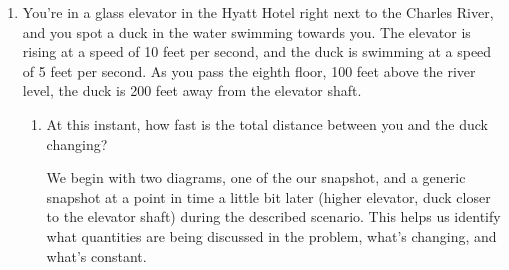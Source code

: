 \documentclass{article}
\begin{document}
\begin{enumerate}
\begin{enumerate}
    \begin{solution}
      
      This translates into asking when $\frac{d\theta}{dt}$ is the greatest. From our previous work, we can solve for $\frac{d\theta}{dt}$ after differentiating:
      \begin{align*}
           \sec^2\theta \frac{d\theta}{dt} &= \frac{1}{80}\cdot \frac{dx}{dt}\\
           \frac{d\theta}{dt}&=\cos^2 \theta \cdot \frac{1}{80}\cdot \frac{dx}{dt}
      \end{align*}
      The bear is still moving at 25 feet per second, so we can input $\frac{dx}{dt}=-25$, giving us:
      $$\frac{d\theta}{dt}= \frac{-25}{80}\cdot \cos^2 \theta $$
      The magnitude of a quantity is separate from its sign. \\
      
      We can see from this equation that $\frac{d\theta}{dt}$ will be at its largest when $\cos^2\theta$ is at its largest, which occurs when $\cos^2\theta = 1$, or when $\theta = 0$. Where is the bear when $\theta = 0$? Directly in front of the woman, which makes the bear 
  \end{solution}

  \end{enumerate}

  \pspace{\newpage}

\item \label{gottlieb-21.3.23}
\begin{problem}
  You're in a glass elevator in the Hyatt Hotel right next to the
  Charles River, and you spot a duck in the water swimming towards you. The elevator is rising at a speed of 10 feet
  per second, and the duck is swimming at a speed of 5 feet per second. As you pass the eighth floor, 100 feet above the river level, the duck is 200 feet away from the elevator shaft.
\end{problem}
  \begin{enumerate}

  \item 
\begin{problem}
  At this instant, how fast is the total distance between you and the
    duck changing?
\end{problem}
\pspace{\vfill}

    \begin{solution}
        We begin with two diagrams, one of the our snapshot, and a generic snapshot at a point in time a little bit later (higher elevator, duck closer to the elevator shaft) during the described scenario. This helps us identify what quantities are being discussed in the problem, what's changing, and what's constant. \\
        

\end{solution}
\end{enumerate}
\end{enumerate}
\end{document}

